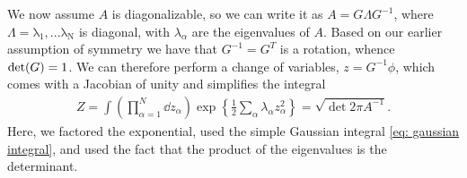 %
We now assume $A$ is diagonalizable, so we can write it as $A = G \Lambda G^{-1} $, where $\Lambda = \mathrm{\lambda_1, ... \lambda_N}$ is diagonal, with $\lambda_\alpha$ are the eigenvalues of $A$. Based on our earlier assumption of symmetry we have that $G^{-1}=G^T$ is a rotation, whence ${\rm det}(G)=1$.
We can therefore perform a change of variables, $z = G^{-1}\phi$, which comes with a Jacobian of unity and simplifies the integral
%
\begin{align}
    Z = \int \left( \prod_{\alpha=1}^N \dd z_\alpha \right)
    \exp \left\{ \frac{1}{2} \sum_{\alpha} \lambda_\alpha z_\alpha^2 \right\}
    =
    \sqrt{ \det 2 \pi A^{-1} }.
\end{align}
%
Here, we factored the exponential, used the simple Gaussian integral \autoref{eq: gaussian integral}, and used the fact that the product of the eigenvalues is the determinant. 
